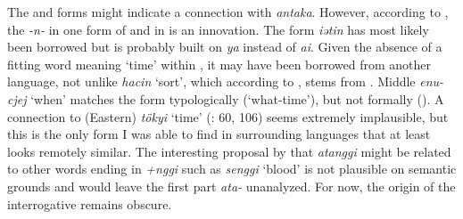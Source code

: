 The  and  forms might indicate a connection with  \textit{antaka}. However, according to \cite{MuYejun1988a,MuYejun1988b}, the \textit{-n-} in one form of  and in  is an innovation. The  form \textit{iətin} has most likely been borrowed but is probably built on  \textit{ya} instead of \textit{ai}. Given the absence of a fitting word meaning ‘time’ within , it may have been borrowed from another language, not unlike  \textit{hacin} ‘sort’, which according to \cite[100]{Benzing1956}, stems from . Middle  \textit{enu-cjej} ‘when’ matches the  form typologically (‘what-time’), but not formally (). A connection to (Eastern)  \textit{tökyi}  ‘time’ (\citealt{Kupchik2011}: 60, 106) seems extremely implausible, but this is the only form I was able to find in surrounding languages that at least looks remotely similar. The interesting proposal by \cite{Alonso2017} that \textit{atanggi} might be related to other words ending in \textit{+nggi} such as \textit{senggi} ‘blood’ is not plausible on semantic grounds and would leave the first part \textit{ata-} unanalyzed. For now, the origin of the interrogative remains obscure.

\clearpage %